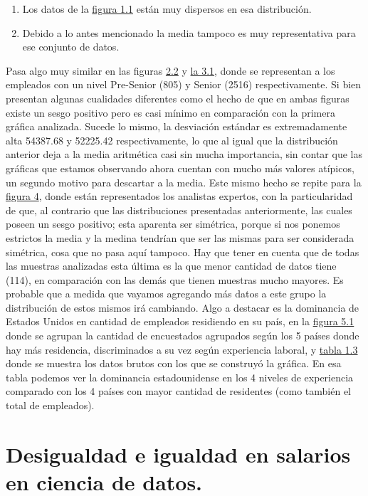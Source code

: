 \documentclass{article}
\begin{document}
	\begin{enumerate}
		\item Los datos de la \hyperref[figura 1.1 diagrama]{figura 1.1} están muy dispersos en esa distribución.
		\item Debido a lo antes mencionado la media tampoco es muy representativa para ese conjunto de datos.
	\end{enumerate}
Pasa algo muy similar en las figuras \hyperref[figura 2.2 diagrama]{2.2} y \hyperref[figura 3.1 diagrama]{la 3.1}, donde se representan a los empleados con un nivel Pre-Senior (805) y Senior (2516) respectivamente. Si bien presentan algunas cualidades diferentes como el hecho de que en ambas figuras existe un sesgo positivo pero es casi mínimo en comparación con la primera gráfica analizada. Sucede lo mismo, la desviación estándar es extremadamente alta 54387.68 y 52225.42 respectivamente, lo que al igual que la distribución anterior deja a la media aritmética casi sin mucha importancia, sin contar que las gráficas que estamos observando ahora cuentan con mucho más valores atípicos, un segundo motivo para descartar a la media. Este mismo hecho se repite para la \hyperref[figura 4.1 diagrama]{figura 4}, donde están representados los analistas expertos, con la particularidad de que, al contrario que las distribuciones presentadas anteriormente, las cuales poseen un sesgo positivo; esta aparenta ser simétrica, porque si nos ponemos estrictos la media y la medina tendrían que ser las mismas para ser considerada simétrica, cosa que no pasa aquí tampoco. Hay que tener en cuenta que de todas las muestras analizadas esta última es la que menor cantidad de datos tiene (114), en comparación con las demás que tienen muestras mucho mayores. Es probable que a medida que vayamos agregando más datos a este grupo la distribución de estos mismos irá cambiando.
Algo a destacar es la dominancia de Estados Unidos en cantidad de empleados residiendo en su país, en la \hyperref[figura 5.1 grafico de barras agrupado]{figura 5.1} donde se agrupan la cantidad de encuestados agrupados según los 5 países donde hay más residencia, discriminados a su vez según experiencia laboral, y \hyperref[tabla 1.3]{tabla 1.3} donde se muestra los datos brutos con los que se construyó la gráfica. En esa tabla podemos ver la dominancia estadounidense en los 4 niveles de experiencia comparado con los 4 países con mayor cantidad de residentes (como también el total de empleados).
	\section{Desigualdad e igualdad en salarios en ciencia de datos.}
\end{document}
